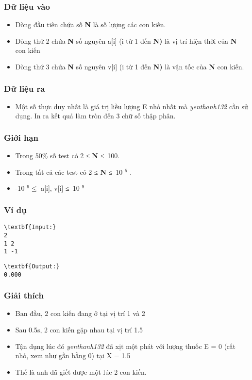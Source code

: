 \subsubsection{\textbf{Dữ liệu vào }}
\begin{itemize}
	\item Dòng đầu tiên chứa số \textbf{ N } là số lượng các con kiến.
	\item Dòng thứ 2 chứa \textbf{ N } số nguyên a[i] (i từ 1 đến \textbf{ N) } là vị trí hiện thời của \textbf{ N } con kiến
	\item Dòng thứ 3 chứa \textbf{ N } số nguyên v[i] (i từ 1 đến \textbf{ N) } là vận tốc của \textbf{ N } con kiến.
\end{itemize}

\subsubsection{\textbf{Dữ liệu ra }}
\begin{itemize}
	\item Một số thực duy nhất là giá trị liều lượng E nhỏ nhất mà \emph{ yenthanh132 } cần sử dụng. In ra kết quả làm tròn đến 3 chữ số thập phân.
\end{itemize}

\subsubsection{Giới hạn}
\begin{itemize}
	\item Trong 50\% số test có 2 ≤ \textbf{ N } ≤ 100.
	\item Trong tất cả các test có 2 ≤ \textbf{ N } ≤ 10 $^ 5 $ .
	\item -10 $^ 9 ≤ $ a[i], v[i] ≤ 10 $^ 9 $
\end{itemize}
\begin{itemize}
\end{itemize}

\subsubsection{\textbf{Ví dụ }}
\begin{verbatim}
\textbf{Input:}
2
1 2
1 -1
\end{verbatim}
\begin{verbatim}
\textbf{Output:}
0.000\end{verbatim}

\subsubsection{Giải thích}
\begin{itemize}
	\item Ban đầu, 2 con kiến đang ở tại vị trí 1 và 2
	\item Sau 0.5s, 2 con kiến gặp nhau tại vị trí 1.5
	\item Tận dụng lúc đó \emph{ yenthanh132 } đã xịt một phát với lượng thuốc E = 0 (rất nhỏ, xem như gần bằng 0) tại X = 1.5
	\item Thế là anh đã giết được một lúc 2 con kiến.
\end{itemize}